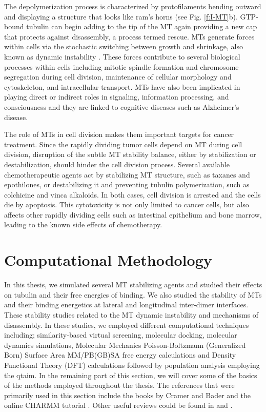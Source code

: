 \documentclass[11pt]{report}
\begin{document}
The 
depolymerization process is characterized by protofilaments
bending outward and displaying a structure that looks 
like ram's horns (see Fig. \ref{f:I-MT}b).
GTP-bound tubulin can begin adding to the tip of the MT
again providing a new cap that protects against disassembly,
a process termed rescue.
MTs generate forces within cells via the stochastic 
switching between growth and shrinkage, also known
as dynamic instability
\cite{Carlier1981}. 
These forces contribute to 
several biological processes within cells including mitotic spindle formation and
chromosome segregation during cell division, maintenance
of cellular morphology and cytoskeleton, and intracellular
transport.
MTs have also been implicated in playing direct or indirect roles in signaling, information processing, and consciousness
and they are linked to cognitive diseases such as 
Alzheimer's disease.

The role of MTs in cell division makes them important targets
for cancer treatment. Since the rapidly dividing tumor
cells depend on MT during cell division, disruption of the
subtle MT stability balance, either by stabilization or destabilization, should hinder
the cell division process. Several available chemotherapeutic
agents act by stabilizing MT structure, such as taxanes 
and epothilones, or destabilizing it and preventing tubulin
polymerization, such as colchicine and vinca alkaloids. In both cases, cell division is arrested and the cells die by
apoptosis.
This cytotoxicity is not only limited to  cancer cells, but
also affects other rapidly dividing cells such 
as intestinal epithelium and bone marrow, leading to the 
known side effects of chemotherapy.


\section{Computational Methodology}
In this thesis, we simulated several
MT stabilizing agents and studied their
effects on tubulin and their free energies of 
binding. We also studied the stability of MTs
and their binding energetics at lateral and longitudinal inter-dimer interfaces. These stability studies related to the 
MT dynamic instability and mechanisms of disassembly. In these studies, we employed 
different computational techniques including;
similarity-based virtual screening, molecular docking, molecular dynamics simulations, 
Molecular Mechanics Poisson-Boltzmann (Generalized Born) Surface Area MM/PB(GB)SA
free energy calculations and 
Density Functional Theory (DFT) calculations
followed by population analysis employing the
\gls{qtaim}. In the remaining part of this section, we
will cover some of the basics of the methods
employed throughout the thesis.
The references that were primarily used in this section include
the books by Cramer \cite{Cramer2004} and Bader \cite{Bader1990}
and the online CHARMM tutorial \cite{CHARMM}. Other useful
reviews could be found in \cite{Adcock2006} and \cite{Karplus2002}. 
\end{document}
